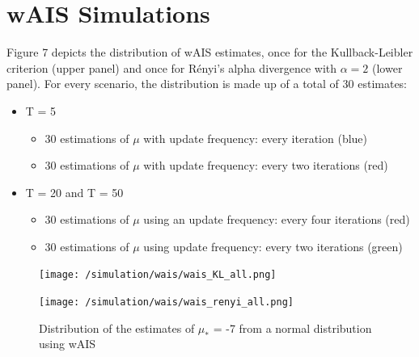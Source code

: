 \pagebreak

\section{wAIS Simulations}

Figure 7 depicts the distribution of wAIS estimates, once for the Kullback-Leibler criterion (upper panel) and once for Rényi's alpha divergence with $\alpha = 2$ (lower panel). For every scenario, the distribution is made up of a total of 30 estimates:
\begin{itemize}

    \item T = 5
    \begin{itemize}
         \item 30 estimations of $\mu$ with update frequency: every iteration (blue)
         \item 30 estimations of $\mu$ with update frequency: every two iterations (red)
    \end{itemize}
    \item T = 20 and T = 50
        \begin{itemize}
         \item 30 estimations of $\mu$ using an update frequency: every four iterations (red)
         \item 30 estimations of $\mu$ using update frequency: every two iterations (green)
    \end{itemize}
\end{itemize}


\begin{figure}[H]
    \centering
    \label{sim:wais-KL-and-R}
\texttt{[image: /simulation/wais/wais\_KL\_all.png]}

\texttt{[image: /simulation/wais/wais\_renyi\_all.png]}
    \caption{Distribution of the estimates of $\mu_*$ = -7 from a normal distribution using wAIS}
    
\end{figure}

